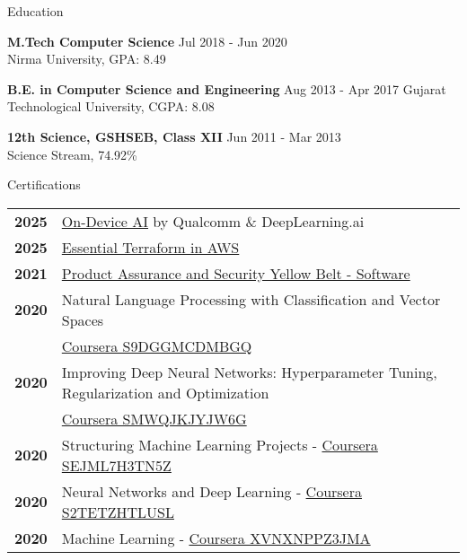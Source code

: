 \documentclass{resume} %
\begin{document}
\begin{rSection}{Education}

{\bf M.Tech Computer Science} \hfill {Jul 2018 - Jun 2020 }
\\ 
Nirma University, GPA: 8.49

{\bf B.E. in Computer Science and Engineering} \hfill {Aug 2013 - Apr 2017 }
Gujarat Technological University, CGPA: 8.08

{\textbf{12th Science, GSHSEB, Class XII}}  \hfill {Jun 2011 - Mar 2013 }\\
Science Stream, 74.92\% 
 


\end{rSection}

\begin{rSection}{Certifications}

\begin{tabular}{ @{} >{\bfseries}l @{\hspace{6ex}} l }
2025 & \href{https://learn.deeplearning.ai/accomplishments/f4188f58-c075-45f4-b2c8-6b6318c51ceb?usp=sharing}{On-Device AI} by Qualcomm \& DeepLearning.ai
\\
2025 & \href{https://www.linkedin.com/learning/certificates/bfa1f8149f171120da54a209a31361de4ac56fe1e3f167e2cbc8cd9fd7ca38d1?u=2140730}{Essential Terraform in AWS}
\\
2021 & \href{https://www.credly.com/badges/a3861155-a2e2-43d5-a8dd-cc21651c5841?source=linked_in_profile}{Product Assurance and Security Yellow Belt - Software}
\\
2020 & Natural Language Processing with Classification
and Vector Spaces
\\ & \href{https://coursera.org/verify/S9DGGMCDMBGQ}{Coursera S9DGGMCDMBGQ}
\\
2020 & Improving Deep Neural Networks: Hyperparameter
Tuning, Regularization and Optimization
\\ & \href{https://coursera.org/verify/SMWQJKJYJW6G}{Coursera SMWQJKJYJW6G}
\\
2020 & Structuring Machine Learning Projects - \href{https://coursera.org/verify/SEJML7H3TN5Z}{Coursera SEJML7H3TN5Z}
\\
2020 & Neural Networks and Deep Learning - \href{https://coursera.org/verify/S2TETZHTLUSL}{Coursera S2TETZHTLUSL}
\\
2020 & Machine Learning - \href{https://coursera.org/verify/XVNXNPPZ3JMA}{Coursera XVNXNPPZ3JMA}

\end{tabular}

\end{rSection}
\end{document}

